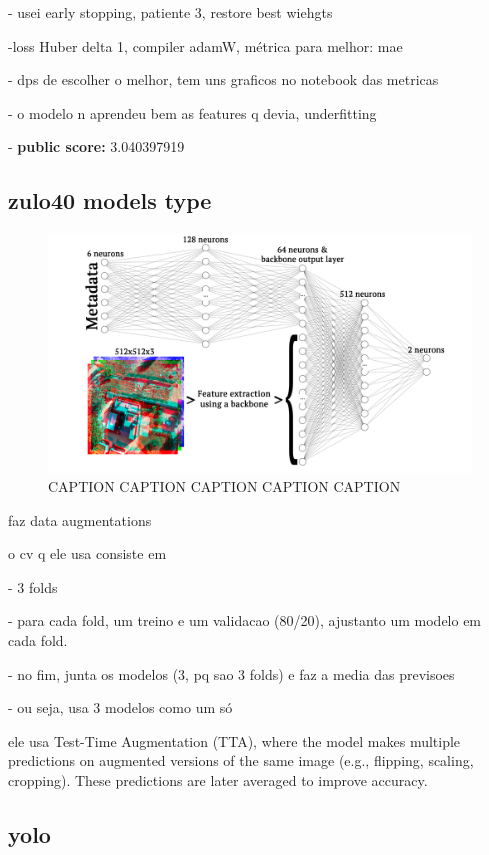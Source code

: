 \documentclass[conference]{IEEEtran}
\begin{document}
- usei early stopping, patiente 3, restore best wiehgts

-loss Huber delta 1, compiler adamW, métrica para melhor: mae

- dps de escolher o melhor, tem uns graficos no notebook das metricas

- o modelo n aprendeu bem as features q devia, underfitting

- \textbf{public score:} 3.040397919


\subsection{zulo40 models type}


\begin{figure}[H]
    \centering
    \includegraphics[width=1\linewidth]{assets/nn.png}
    \caption{CAPTION CAPTION CAPTION CAPTION CAPTION}
    \label{fig:nn}
\end{figure}

faz data augmentations

o cv q ele usa consiste em

- 3 folds

- para cada fold, um treino e um validacao (80/20), ajustanto um modelo em cada fold.

- no fim, junta os modelos (3, pq sao 3 folds) e faz a media das previsoes

- ou seja, usa 3 modelos como um só

ele usa Test-Time Augmentation (TTA), where the model makes multiple predictions on augmented versions of the same image (e.g., flipping, scaling, cropping). These predictions are later averaged to improve accuracy.

\subsection{yolo}
\end{document}
